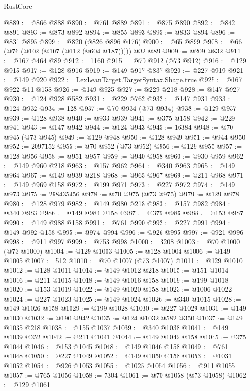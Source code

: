 \begin{lexlean}{RustCore}
\begin{coremodule}
@889 := @866 @888
@890 := @761 @889
@891 := @875 @890
@892 := @842 @891
@893 := @873 @892
@894 := @855 @893
@895 := @833 @894
@896 := @831 @895
@899 := @820 (@826 @896 @176)
@900 := @65 @899
@908 := @66 (@76 (@102 (@107 (@112 (@604 @187))))) @32 @89
@909 := @209 @832
@911 := @167 @464 @89
@912 := 1160
@915 := @70 @912 (@73 @912)
@916 := @129 @915
@917 := @128 @916
@919 := @149 @917 @837
@920 := @227 @919
@921 := @149 @920
@922 := LexLeanTarget.TargetSyntax.Shape.true
@925 := @167 @922 @11 @158
@926 := @149 @925
@927 := @229 @218
@928 := @147 @927
@930 := @124 @928 @582
@931 := @229 @762
@932 := @147 @931
@933 := @124 @932
@934 := 128
@937 := @70 @934 (@73 @934)
@938 := @129 @937
@939 := @128 @938
@940 := @933 @939
@941 := @375 @158
@942 := @229 @941
@943 := @147 @942
@944 := @124 @943
@945 := 16384
@948 := @70 @945 (@73 @945)
@949 := @129 @948
@950 := @128 @949
@951 := @944 @950
@952 := 2097152
@955 := @70 @952 (@73 @952)
@956 := @129 @955
@957 := @128 @956
@958 := @951 @957
@959 := @940 @958
@960 := @930 @959
@962 := @149 @960 @218
@963 := @157 @962
@964 := @340 @963
@965 := @149 @964
@967 := @149 @939 @218
@968 := @965 @967
@969 := @211 @968
@971 := @149 @969 @158
@972 := @199 @971
@973 := @227 @972
@974 := @149 @973
@975 := 268435456
@978 := @70 @975 (@73 @975)
@979 := @129 @978
@980 := @128 @979
@982 := @149 @980 @218
@983 := @157 @982
@984 := @340 @983
@986 := @149 @984 @158
@987 := @375 @986
@988 := @153 @987
@990 := @149 @988 @158
@991 := @761 @990
@992 := @227 @991
@994 := @149 @992 @158
@995 := @974 @994
@996 := @926 @995
@997 := @921 @996
@998 := @911 @997
@999 := @753 @998
@1000 := 3208
@1003 := @70 @1000 (@73 @1000)
@1004 := @129 @1003
@1005 := @128 @1004
@1006 := @149 @1005
@1007 := 512
@1010 := @70 @1007 (@73 @1007)
@1011 := @129 @1010
@1012 := @128 @1011
@1014 := @149 @1012 @218
@1015 := @151 @1014
@1016 := @211 @1015
@1018 := @149 @1016 @158
@1019 := @199 @1018
@1020 := @153 @1019
@1022 := @149 @1020 @158
@1023 := @1006 @1022
@1024 := @227 @1023
@1025 := @149 @1024
@1026 := @340 @1015
@1028 := @149 @1026 @158
@1029 := @199 @1028
@1030 := @227 @1029
@1031 := @149 @1030
@1032 := @190 @942
@1035 := @124 @1032 @582 @350
@1037 := @149 @1035 @218
@1038 := @155 @1037
@1039 := @340 @1038
@1041 := @149 @1039 @352
@1042 := @211 @1041
@1044 := @149 @1042 @158
@1045 := @375 @1044
@1046 := @153 @1045
@1048 := @149 @1046 @158
@1049 := @761 @1048
@1050 := @227 @1049
@1052 := @149 @1050 @158
@1053 := @1031 @1052
@1054 := @926 @1053
@1055 := @1025 @1054
@1056 := @911 @1055
@1057 := @765 @1056
@1058 := 7304
@1061 := @70 @1058 (@73 @1058)
@1062 := @129 @1061

\end{coremodule}
\end{lexlean}
